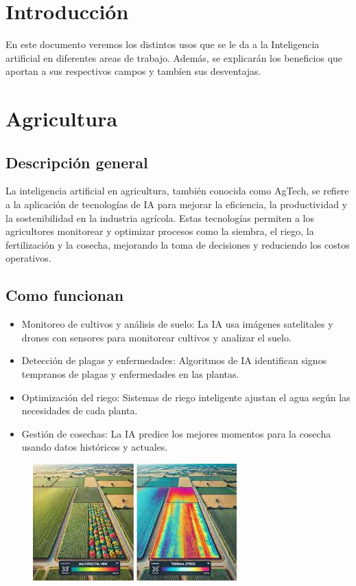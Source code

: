 \documentclass[12pt]{article}
\begin{document}
\section{Introducción}

En este documento veremos los distintos usos que se le da a la Inteligencia artificial en diferentes areas
de trabajo. Además, se explicarán los beneficios que aportan a sus respectivos campos y tambíen sus desventajas.

\section{Agricultura}

\subsection{Descripción general}

La inteligencia artificial en agricultura, también conocida como AgTech, se refiere a la aplicación de tecnologías de IA para 
mejorar la eficiencia, la productividad y la sostenibilidad en la industria agrícola. Estas tecnologías permiten a los agricultores
monitorear y optimizar procesos como la siembra, el riego, la fertilización y la cosecha, mejorando la toma de decisiones y reduciendo
los costos operativos.

\subsection{Como funcionan}

\begin{itemize}
    \item Monitoreo de cultivos y análisis de suelo: 
    La IA usa imágenes satelitales y drones con sensores para monitorear cultivos y analizar el suelo.
    \item Detección de plagas y enfermedades: 
    Algoritmos de IA identifican signos tempranos de plagas y enfermedades en las plantas.
    \item Optimización del riego: 
    Sistemas de riego inteligente ajustan el agua según las necesidades de cada planta.
    \item Gestión de cosechas: 
    La IA predice los mejores momentos para la cosecha usando datos históricos y actuales.
\end{itemize}

\begin{figure}[h!]
    \centering
    \includegraphics[width=.6\textwidth]{agricultura.png}
    \label{fig:my_label}
\end{figure}
\end{document}
